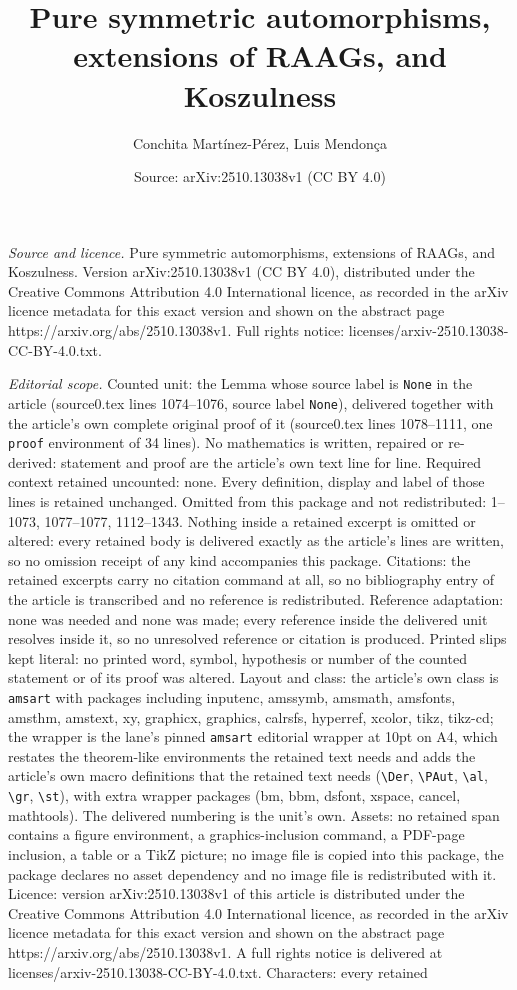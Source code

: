 \documentclass[10pt,a4paper]{amsart}
\title[Pure symmetric automorphisms, extensions of RAAGs, and Koszu]{Pure symmetric automorphisms, extensions of RAAGs, and Koszulness}
\author{Conchita Mart\'inez-P\'erez, Luis Mendon\c{c}a}
\date{Source: arXiv:2510.13038v1 (CC BY 4.0)}
\begin{document}
\maketitle

\noindent\emph{Source and licence.} Pure symmetric automorphisms, extensions of RAAGs, and Koszulness. Version arXiv:2510.13038v1 (CC BY 4.0), distributed under the Creative Commons Attribution 4.0 International licence, as recorded in the arXiv licence metadata for this exact version and shown on the abstract page https://arxiv.org/abs/2510.13038v1. Full rights notice: licenses/arxiv-2510.13038-CC-BY-4.0.txt.\par\smallskip

\noindent\textit{Editorial scope.} Counted unit: the Lemma whose source label is \texttt{None} in the article (source0.tex lines 1074--1076, source label \texttt{None}), delivered together with the article's own complete original proof of it (source0.tex lines 1078--1111, one \texttt{proof} environment of 34 lines). No mathematics is written, repaired or re-derived: statement and proof are the article's own text line for line. Required context retained uncounted: none. Every definition, display and label of those lines is retained unchanged. Omitted from this package and not redistributed: 1--1073, 1077--1077, 1112--1343. Nothing inside a retained excerpt is omitted or altered: every retained body is delivered exactly as the article's lines are written, so no omission receipt of any kind accompanies this package. Citations: the retained excerpts carry no citation command at all, so no bibliography entry of the article is transcribed and no reference is redistributed. Reference adaptation: none was needed and none was made; every reference inside the delivered unit resolves inside it, so no unresolved reference or citation is produced. Printed slips kept literal: no printed word, symbol, hypothesis or number of the counted statement or of its proof was altered. Layout and class: the article's own class is \texttt{amsart} with packages including inputenc, amssymb, amsmath, amsfonts, amsthm, amstext, xy, graphicx, graphics, calrsfs, hyperref, xcolor, tikz, tikz-cd; the wrapper is the lane's pinned \texttt{amsart} editorial wrapper at 10pt on A4, which restates the theorem-like environments the retained text needs and adds the article's own macro definitions that the retained text needs (\texttt{\textbackslash Der}, \texttt{\textbackslash PAut}, \texttt{\textbackslash al}, \texttt{\textbackslash gr}, \texttt{\textbackslash st}), with extra wrapper packages (bm, bbm, dsfont, xspace, cancel, mathtools). The delivered numbering is the unit's own. Assets: no retained span contains a figure environment, a graphics-inclusion command, a PDF-page inclusion, a table or a TikZ picture; no image file is copied into this package, the package declares no asset dependency and no image file is redistributed with it. Licence: version arXiv:2510.13038v1 of this article is distributed under the Creative Commons Attribution 4.0 International licence, as recorded in the arXiv licence metadata for this exact version and shown on the abstract page https://arxiv.org/abs/2510.13038v1. A full rights notice is delivered at licenses/arxiv-2510.13038-CC-BY-4.0.txt. Characters: every retained 
\end{document}
